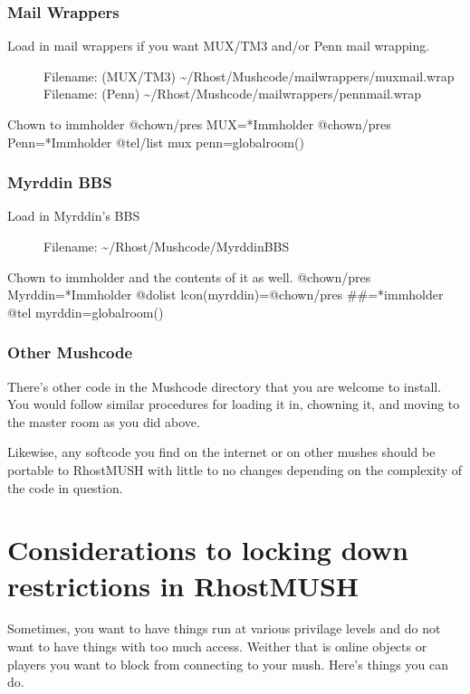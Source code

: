 \documentclass[letterpaper,10pt,english]{sphinxmanual}
\begin{document}
\subsection{Mail Wrappers}
\label{\detokenize{05-newmush:mail-wrappers}}\begin{description}
\item[{Load in mail wrappers if you want MUX/TM3 and/or Penn mail wrapping.}] \leavevmode
\sphinxAtStartPar
Filename: (MUX/TM3) \textasciitilde{}/Rhost/Mushcode/mailwrappers/muxmail.wrap
Filename: (Penn)    \textasciitilde{}/Rhost/Mushcode/mailwrappers/pennmail.wrap

\end{description}

\sphinxAtStartPar
Chown to immholder
@chown/pres MUX=*Immholder
@chown/pres Penn=*Immholder
@tel/list mux penn=globalroom()


\subsection{Myrddin BBS}
\label{\detokenize{05-newmush:myrddin-bbs}}\begin{description}
\item[{Load in Myrddin’s BBS}] \leavevmode
\sphinxAtStartPar
Filename: \textasciitilde{}/Rhost/Mushcode/MyrddinBBS

\end{description}

\sphinxAtStartPar
Chown to immholder and the contents of it as well.
@chown/pres Myrddin=*Immholder
@dolist lcon(myrddin)=@chown/pres \#\#=*immholder
@tel myrddin=globalroom()


\subsection{Other Mushcode}
\label{\detokenize{05-newmush:other-mushcode}}
\sphinxAtStartPar
There’s other code in the Mushcode directory that you are welcome to install.  You would follow similar procedures
for loading it in, chowning it, and moving to the master room as you did above.

\sphinxAtStartPar
Likewise, any softcode you find on the internet or on other mushes should be portable to RhostMUSH with little to
no changes depending on the complexity of the code in question.


\chapter{Considerations to locking down restrictions in RhostMUSH}
\label{\detokenize{06-security:considerations-to-locking-down-restrictions-in-rhostmush}}\label{\detokenize{06-security::doc}}
\sphinxAtStartPar
Sometimes, you want to have things run at various privilage levels and do not
want to have things with too much access.  Weither that is online objects or
players you want to block from connecting to your mush.  Here’s things you can
do.
\end{document}
